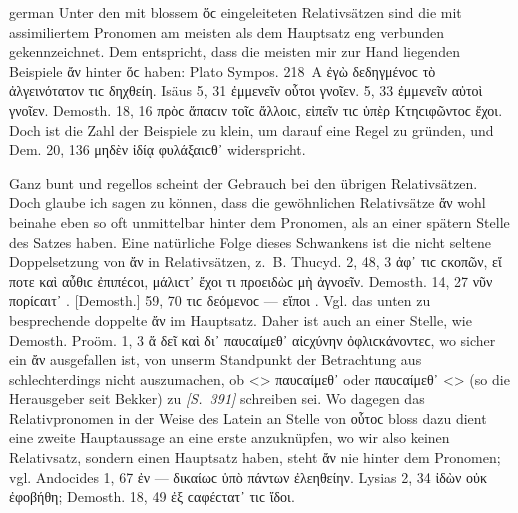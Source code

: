 \begin{otherlanguage*}{german}
Unter den mit blossem ὅϲ eingeleiteten Relativsätzen sind die mit assimiliertem Pronomen am meisten als dem Hauptsatz eng verbunden gekennzeichnet. Dem entspricht, dass die meisten mir zur Hand liegenden Beispiele ἄν hinter ὅϲ haben: Plato Sympos. 218~A ἐγὼ δεδηγμένοϲ τὸ ἀλγεινότατον  τιϲ δηχθείη. Isäus 5, 31 ἐμμενεῖν  οὗτοι γνοῖεν. 5, 33 ἐμμενεῖν  αὐτοὶ γνοῖεν. Demosth. 18, 16 πρὸϲ ἅπαϲιν τοῖϲ ἄλλοιϲ,  εἰπεῖν τιϲ ὑπὲρ Κτηϲιφῶντοϲ ἔχοι. Doch ist die Zahl der Beispiele zu klein, um darauf eine Regel zu gründen, und Dem. 20, 136 μηδὲν  ἰδίᾳ φυλάξαιϲθ᾽  widerspricht.

Ganz bunt und regellos scheint der Gebrauch bei den übrigen Relativsätzen. Doch glaube ich sagen zu können, dass die gewöhnlichen Relativsätze ἄν wohl beinahe eben so oft unmittelbar hinter dem Pronomen, als an einer spätern Stelle des Satzes haben. Eine natürliche Folge dieses Schwankens ist die nicht seltene Doppelsetzung von ἄν in Relativsätzen, z.~B. Thucyd. 2, 48, 3 ἀφ᾽  τιϲ ϲκοπῶν, εἴ ποτε καὶ αὖθιϲ ἐπιπέϲοι, μάλιϲτ᾽  ἔχοι τι προειδὼϲ μὴ ἀγνοεῖν. Demosth. 14, 27  νῦν πορίϲαιτ᾽ . [Demosth.] 59, 70  τιϲ δεόμενοϲ — εἴποι . Vgl. das unten zu besprechende doppelte ἄν im Hauptsatz. Daher ist auch an einer Stelle, wie Demosth. Proöm. 1, 3 ἅ δεῖ καὶ δι᾽  παυϲαίμεθ᾽ αἰϲχύνην ὀφλιϲκάνοντεϲ, wo sicher ein ἄν ausgefallen ist, von unserm Standpunkt der Betrachtung aus schlechterdings nicht auszumachen, ob  <> παυϲαίμεθ᾽ oder  παυϲαίμεθ᾽ <> (so die Herausgeber seit Bekker) zu \hypertarget{p391}{\emph{[S.~391]}}\label{p391} schreiben sei. Wo dagegen das Relativpronomen in der Weise des Latein an Stelle von οὗτοϲ bloss dazu dient eine zweite Hauptaussage an eine erste anzuknüpfen, wo wir also keinen Relativsatz, sondern einen Hauptsatz haben, steht ἄν nie hinter dem Pronomen; vgl. Andocides 1, 67 ἐν  — δικαίωϲ  ὑπὸ πάντων ἐλεηθείην. Lysias 2, 34  ἰδὼν οὐκ  ἐφοβήθη; Demosth. 18, 49 ἐξ  ϲαφέϲτατ᾽  τιϲ ἴδοι.


\end{otherlanguage*}
